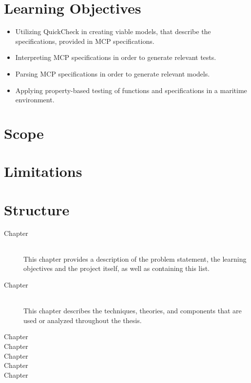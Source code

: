 \section{Learning Objectives}

\begin{itemize}
	\item Utilizing QuickCheck in creating viable models, that describe the specifications, provided in MCP specifications.
	\item Interpreting MCP specifications in order to generate relevant tests.
	\item Parsing MCP specifications in order to generate relevant models.
	\item Applying property-based testing of functions and specifications in a maritime environment.
\end{itemize}

\section{Scope}

\section{Limitations}

\section{Structure}

\begin{description}
	\item[Chapter ]\ \\
	This chapter provides a description of the problem statement, the learning objectives and the project itself, as well as containing this list.
	\item[Chapter ]\ \\
	This chapter describes the techniques, theories, and components that are used or analyzed throughout the thesis.
	\item[Chapter ]%
	\item[Chapter ]%
	\item[Chapter ]%
	\item[Chapter ]%
	\item[Chapter ]%
\end{description}